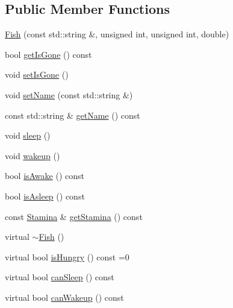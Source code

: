 \subsection*{Public Member Functions}
\begin{DoxyCompactItemize}
\item 
\hyperlink{classFish_a7f97c2f2fea7930e5c82b8e7edd382ac_a7f97c2f2fea7930e5c82b8e7edd382ac}{Fish} (const std\+::string \&, unsigned int, unsigned int, double)
\item 
bool \hyperlink{classFish_a64e050916c0094ac377b8ec0d86a000b_a64e050916c0094ac377b8ec0d86a000b}{get\+Is\+Gone} () const
\item 
void \hyperlink{classFish_ad7d3a39831fa4a170a63dde98474b728_ad7d3a39831fa4a170a63dde98474b728}{set\+Is\+Gone} ()
\item 
void \hyperlink{classFish_a27a489adca6d1dc91b011ee97f36ae75_a27a489adca6d1dc91b011ee97f36ae75}{set\+Name} (const std\+::string \&)
\item 
const std\+::string \& \hyperlink{classFish_a96583314997aab0826f1c595f7d58938_a96583314997aab0826f1c595f7d58938}{get\+Name} () const
\item 
void \hyperlink{classFish_acac2f4f6c31adfb0c8f4eb78853445bb_acac2f4f6c31adfb0c8f4eb78853445bb}{sleep} ()
\item 
void \hyperlink{classFish_a8160593a43c6ce5263c6280e0cf0a7be_a8160593a43c6ce5263c6280e0cf0a7be}{wakeup} ()
\item 
bool \hyperlink{classFish_aea2a66c3cd46d3a672c82ca9e537b9ec_aea2a66c3cd46d3a672c82ca9e537b9ec}{is\+Awake} () const
\item 
bool \hyperlink{classFish_a4772391eb9a92dca61b810b40705709b_a4772391eb9a92dca61b810b40705709b}{is\+Asleep} () const
\item 
const \hyperlink{classStamina}{Stamina} \& \hyperlink{classFish_a8637a567ecb17376bed45783d5ddb53d_a8637a567ecb17376bed45783d5ddb53d}{get\+Stamina} () const
\item 
virtual \hyperlink{classFish_a23885c7956e22f0181360098cfe16659_a23885c7956e22f0181360098cfe16659}{$\sim$\+Fish} ()
\item 
virtual bool \hyperlink{classFish_a5fa8678bf28b723cfd2e225c217bb523_a5fa8678bf28b723cfd2e225c217bb523}{is\+Hungry} () const =0
\item 
virtual bool \hyperlink{classFish_a9a94edb09498e8d0d2381c2cc3e2e9dc_a9a94edb09498e8d0d2381c2cc3e2e9dc}{can\+Sleep} () const
\item 
virtual bool \hyperlink{classFish_a033298bf0dc885b82dbd195fc4997643_a033298bf0dc885b82dbd195fc4997643}{can\+Wakeup} () const

\end{DoxyCompactItemize}
